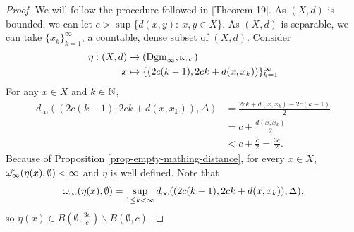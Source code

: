 \begin{proof}
    We will follow the procedure followed in \cite{bubenik}[Theorem 19]. As $ (X, d) $ is bounded, we can let $ c > \sup \{d(x, y): \  x, y \in X\} $. As $ (X, d) $ is separable, we can take $ \{x_k\}_{k=1}^\infty $, a countable, dense subset of $ (X, d) $. Consider
    \begin{align*}
        \eta: (X, d) &\to (\operatorname{Dgm}_\infty, \omega_\infty) \\
        x &\mapsto \{(2c(k-1), 2ck + d(x, x_k))\}_{k=1}^\infty
    \end{align*}
    For any $ x \in X $ and $ k \in \mathbb N$,
    \begin{align*}
        d_\infty((2c(k-1), 2ck + d(x, x_k)), \Delta) 
        &= \frac{2ck + d(x, x_k) - 2c(k-1)}{2} \\
        &= c + \frac{d(x, x_k)}{2} \\
        &< c + \frac{c}{2} = \frac{3c}{2}.
    \end{align*}
    Because of Proposition \ref{prop-empty-mathing-distance}, for every $ x \in X $, $ \tilde {\omega_\infty}(\eta(x), \emptyset) < \infty $ and $ \eta $ is well defined. Note that
    \begin{align*}
        \omega_\infty(\eta(x), \emptyset) = \sup_{1 \leq k < \infty} d_\infty((2c(k-1), 2ck + d(x, x_k)), \Delta),
    \end{align*}
    so $ \eta(x) \in B(\emptyset, \frac{3c}{c}) \backslash B(\emptyset, c)$.


\end{proof}
